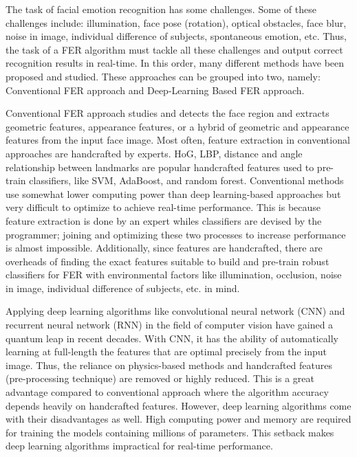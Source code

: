 \documentclass[master]{thesis-uestc}
\begin{document}
The task of facial emotion recognition has some challenges. Some of these challenges include: illumination, face pose (rotation), optical obstacles, face blur, noise in image, individual difference of subjects, spontaneous emotion, etc. Thus, the task of a FER algorithm must tackle all these challenges and output correct recognition results in real-time. In this order, many different methods have been proposed and studied. These approaches can be grouped into two, namely: Conventional FER approach and Deep-Learning Based FER approach.

Conventional FER approach studies and detects the face region and extracts geometric features, appearance features, or a hybrid of geometric and appearance features from the input face image. Most often, feature extraction in conventional approaches are handcrafted by experts. HoG, LBP, distance and angle relationship between landmarks are popular handcrafted features used to pre-train classifiers, like SVM, AdaBoost, and random forest. Conventional methods use somewhat lower computing power than deep learning-based approaches but very difficult to optimize to achieve real-time performance. This is because feature extraction is done by an expert whiles classifiers are devised by the programmer; joining and optimizing these two processes to increase performance is almost impossible. Additionally, since features are handcrafted, there are overheads of finding the exact features suitable to build and pre-train robust classifiers for FER with environmental factors like illumination, occlusion, noise in image, individual difference of subjects, etc. in mind.

Applying deep learning algorithms like convolutional neural network (CNN) and recurrent neural network (RNN) in the field of computer vision have gained a quantum leap in recent decades. With CNN, it has the ability of automatically learning at full-length the features that are optimal precisely from the input image. Thus, the reliance on physics-based methods and handcrafted features (pre-processing technique) are removed or highly reduced. This is a great advantage compared to conventional approach where the algorithm accuracy depends heavily on handcrafted features. However, deep learning algorithms come with their disadvantages as well. High computing power and memory are required for training the models containing millions of parameters. This setback makes deep learning algorithms impractical for real-time performance.
\end{document}
